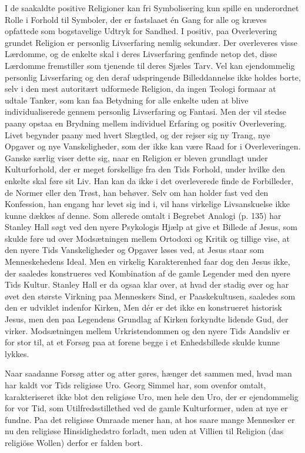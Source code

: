 \documentclass[12pt]{article}
\newcommand{\apage}[1]{\marginnote{\footnotesize\textit{[#1]}}}
\begin{document}
I de saakaldte positive Religioner kan fri Symbolisering kun spille en
underordnet Rolle i Forhold til Symboler, der er fastslaaet én Gang for alle og
kræves opfattede som bogstavelige Udtryk for Sandhed. I positiv, paa
Overlevering grundet Religion er personlig Livserfaring nemlig sekundær. Der
overleveres visse Lærdomme, og de enkelte skal i deres Livserfaring genfinde
netop det, disse Lærdomme fremstiller som tjenende til deres Sjæles Tarv. Vel
kan ejendommelig personlig Livserfaring og den deraf udspringende
Billeddannelse ikke holdes borte, selv i den mest autoritært udformede
Religion, da ingen Teologi formaar
\setcounter{footnote}{0}%
\apage{104}at udtale Tanker, som kan faa Betydning for alle enkelte uden at
blive individualiserede gennem personlig Livserfaring og Fantasi. Men der vil
stedse paany opstaa en Brydning mellem individuel Erfaring og positiv
Overlevering. Livet begynder paany med hvert Slægtled, og der rejser sig ny
Trang, nye Opgaver og nye Vanskeligheder, som der ikke kan være Raad for i
Overleveringen. Ganske særlig viser dette sig, naar en Religion er bleven
grundlagt under Kulturforhold, der er meget forskellige fra den Tids Forhold,
under hvilke den enkelte skal føre sit Liv. Han kan da ikke i det overleverede
finde de Forbilleder, de Normer eller den Trøst, han behøver. Selv om han
holder fast ved den Konfession, han engang har levet sig ind i, vil hans
virkelige Livsanskuelse ikke kunne dækkes af denne. Som allerede omtalt i
\guillemotright{}Begrebet Analogi\guillemotleft{} (p. 135) har Stanley Hall
søgt ved den nyere Psykologis Hjælp at give et Billede af Jesus, som skulde
føre ud over Modsætningen mellem Ortodoxi og Kritik og tillige vise, at den
nyere Tids Vanskeligheder og Opgaver løses ved, at Jesus staar som
Menneskehedens Ideal. Men en virkelig Karakterenhed faar dog den Jesus ikke,
der saaledes konstrueres ved Kombination af de gamle Legender med den nyere
Tids Kultur. Stanley Hall er da ogsaa klar over, at hvad der stadig øver og har
øvet den største Virkning paa Menneskers Sind, er Paaskekultusen, saaledes som
den er udviklet indenfor Kirken, Men dér er det ikke en konstrueret historisk
Jesus, men den paa Legendens Grundlag af Kirken forkyndte lidende Gud, der
virker. Modsætningen mellem Urkristendommen og den nyere Tids Aandsliv er for
stor til, at et Forsøg paa at forene begge i et Enhedsbillede skulde kunne lykkes.

\setcounter{footnote}{0}%
\apage{105}Naar saadanne Forsøg atter og atter gøres, hænger det sammen med,
hvad man har kaldt vor Tids religiøse Uro. Georg Simmel har, som ovenfor
omtalt, karakteriseret ikke blot den religiøse Uro, men hele den Uro, der er
ejendommelig for vor Tid, som Utilfredsstillethed ved de gamle Kulturformer,
uden at nye er fundne. Paa det religiøse Omraade mener han, at hos saare mange
Mennesker er nu den religiøse Hinsidighedstro forladt, men uden at Villien til
Religion (das religiöse Wollen) derfor er falden bort.
\end{document}

